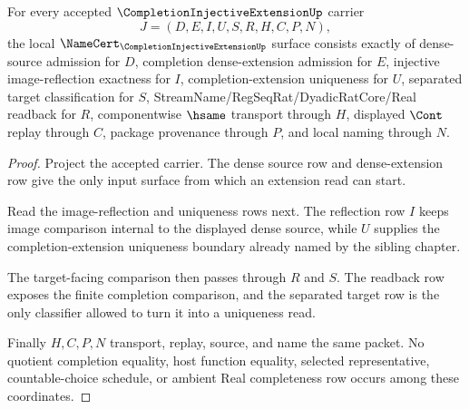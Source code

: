 \begin{theorem}
\label{thm:completion-injective-extension-namecert-obligations}
For every accepted $\CompletionInjectiveExtensionUp$ carrier
$$
J=(D,E,I,U,S,R,H,C,P,N),
$$
the local $\NameCert_{\CompletionInjectiveExtensionUp}$ surface consists exactly of dense-source admission for $D$, completion dense-extension admission for $E$, injective image-reflection exactness for $I$, completion-extension uniqueness for $U$, separated target classification for $S$, StreamName/RegSeqRat/DyadicRatCore/Real readback for $R$, componentwise $\hsame$ transport through $H$, displayed $\Cont$ replay through $C$, package provenance through $P$, and local naming through $N$.
\end{theorem}
\begin{proof}
Project the accepted carrier. The dense source row and dense-extension row give the only input surface from which an extension read can start.

Read the image-reflection and uniqueness rows next. The reflection row $I$ keeps image comparison internal to the displayed dense source, while $U$ supplies the completion-extension uniqueness boundary already named by the sibling chapter.

The target-facing comparison then passes through $R$ and $S$. The readback row exposes the finite completion comparison, and the separated target row is the only classifier allowed to turn it into a uniqueness read.

Finally $H,C,P,N$ transport, replay, source, and name the same packet. No quotient completion equality, host function equality, selected representative, countable-choice schedule, or ambient Real completeness row occurs among these coordinates.
\end{proof}

